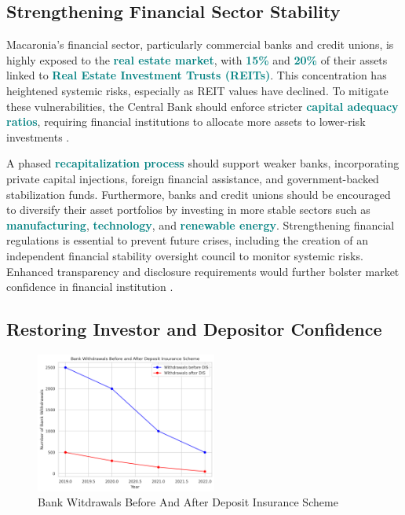 \subsection*{Strengthening Financial Sector Stability}
Macaronia’s financial sector, particularly commercial banks and credit unions, 
is highly exposed to the \textbf{\textcolor{teal}{real estate market}}, with 
\textbf{\textcolor{teal}{15\%}} and \textbf{\textcolor{teal}{20\%}} of their assets linked to 
\textbf{\textcolor{teal}{Real Estate Investment Trusts (REITs)}}. This concentration has heightened 
systemic risks, especially as REIT values have declined. To mitigate these vulnerabilities, 
the Central Bank should enforce stricter \textbf{\textcolor{teal}{capital adequacy ratios}},
requiring financial institutions to allocate more assets to lower-risk investments
\textcolor{orange}{\cite{mishkin2021}}.


A phased \textbf{\textcolor{teal}{recapitalization process}} should support weaker banks,
incorporating private capital injections, foreign financial assistance, and government-backed stabilization
funds. Furthermore, banks and credit unions should be encouraged to diversify their asset portfolios by
investing in more stable sectors such as \textbf{\textcolor{teal}{manufacturing}},
\textbf{\textcolor{teal}{technology}}, and \textbf{\textcolor{teal}{renewable energy}}. 
Strengthening financial regulations is essential to prevent future crises,
including the creation of an independent financial stability oversight council to monitor systemic risks.
Enhanced transparency and disclosure requirements would further bolster market confidence in financial 
institution \textcolor{orange}{\cite{reinhart2009}}.

\subsection*{Restoring Investor and Depositor Confidence}

\begin{figure}[h]     
     \centering
     \includegraphics[width=0.53\textwidth]{restore.png}
     \caption{Bank Witdrawals Before And After Deposit Insurance Scheme}
     \label{fig:graph_1}
\end{figure}

